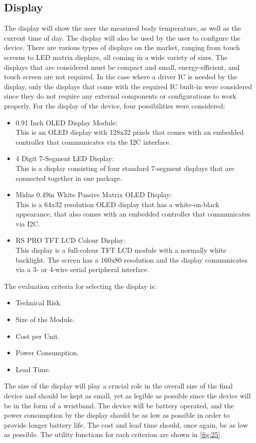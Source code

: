 \subsection{Display}\label{disp}
The display will show the user the measured body temperature, as well as the current time of day. The display will also be used by the user to configure the device. There are various types of displays on the market, ranging from touch screens to LED matrix displays, all coming in a wide variety of sizes. The displays that are considered must be compact and small, energy-efficient, and touch screen are not required. In the case where a driver IC is needed by the display, only the displays that come with the required IC built-in were considered since they do not require any external components or configurations to work properly. For the display of the device, four possibilities were considered:
\begin{itemize}
	\item 0.91 Inch OLED Display Module:\\
	This is an OLED display with 128x32 pixels that comes with an embedded controller that communicates via the I2C interface. 
	\item 4 Digit 7-Segment LED Display:\\
	This is a display consisting of four standard 7-segment displays that are connected together in one package.  
	\item Midas 0.49in White Passive Matrix OLED Display:\\
	This is a 64x32 resolution OLED display that has a white-on-black appearance, that also comes with an embedded controller that communicates via I2C.
	\item RS PRO TFT LCD Colour Display:\\
	This display is a full-colour TFT LCD module with a normally white backlight. The screen has a 160x80 resolution and the display communicates via a 3- or 4-wire serial peripheral interface.
\end{itemize}
\noindent
The evaluation criteria for selecting the display is:
\begin{itemize}[noitemsep]
	\item Technical Risk.
	\item Size of the Module.
	\item Cost per Unit.
	\item Power Consumption.
	\item Lead Time.
\end{itemize}
\noindent
The size of the display will play a crucial role in the overall size of the final device and should be kept as small, yet as legible as possible since the device will be in the form of a wristband. The device will be battery operated, and the power consumption by the display should be as low as possible in order to provide longer battery life. The cost and lead time should, once again, be as low as possible. The utility functions for each criterion are shown in \autoref{fig:25}.
